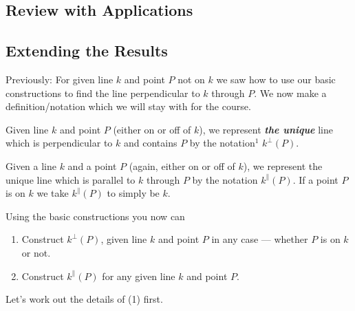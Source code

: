 \documentclass{tufte-handout}
\newcommand{\uv}{\vspace{.1in}}
\begin{document}
\pagebreak 
\begin{tcolorbox}[enhanced jigsaw,breakable,pad at break*=1mm,
  colback=cyan!2!white,colframe=blue!75!black,title=Student View: Slide 3,drop fuzzy shadow,watermark color=white,watermark text=\arabic{tcbbreakpart}]
  \section{Review with Applications}\subsection{Extending the Results}
  Previously: For given line $k$ and point $P$ not on $k$ we saw how to use our basic constructions to find the line perpendicular to $k$ through $P.$ We now make a definition/notation which we will stay with for the course.
  
  \uv {} Given line $k$ and point $P$ (either on or off of $k$), we represent \textbf{\textit{the unique}} line which is perpendicular to $k$ and contains $P$ by the notation$^1$ $k^{\perp}(P).$ 
  
  \uv {} Given a line $k$ and a point $P$ (again, either on or off of $k$), we represent the unique line which is parallel to $k$ through $P$ by the notation $k^{\parallel}(P).$ If a point $P$ is on $k$ we take $k^{\parallel}(P)$ to simply be $k.$
  
  
   Using the basic constructions you now can
  \begin{enumerate}
      \item Construct $k^{\perp}(P)$, given line $k$ and point $P$ in any case --- whether $P$ is on $k$ or not.
      \item Construct $k^{\parallel}(P)$ for any given line $k$ and point $P$. 
  \end{enumerate}
  Let's work out the details of (1) first.
 
\end{tcolorbox}
\end{document}
